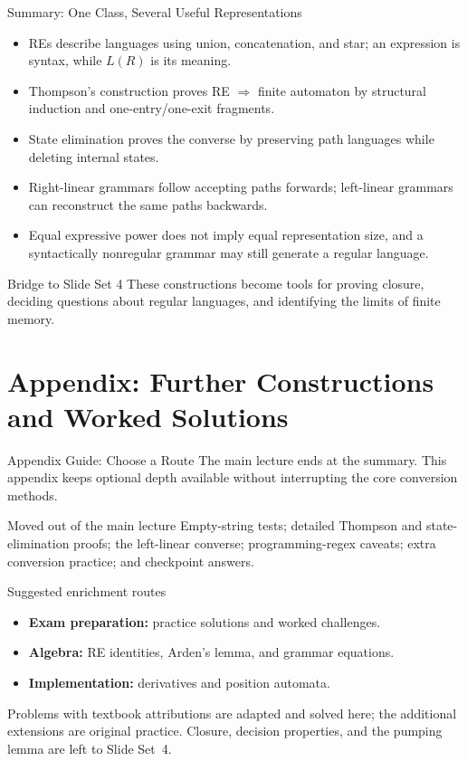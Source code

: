 \documentclass[10pt]{beamer}
\begin{document}
\begin{frame}{Summary: One Class, Several Useful Representations}
  \small
  \begin{itemize}
    \item REs describe languages using union, concatenation, and star;
      an expression is syntax, while $L(R)$ is its meaning.
    \pause
    \item Thompson's construction proves RE $\Rightarrow$ finite automaton
      by structural induction and one-entry/one-exit fragments.
    \pause
    \item State elimination proves the converse by preserving path languages
      while deleting internal states.
    \pause
    \item Right-linear grammars follow accepting paths forwards; left-linear
      grammars can reconstruct the same paths backwards.
    \pause
    \item Equal expressive power does not imply equal representation size,
      and a syntactically nonregular grammar may still generate a regular
      language.
  \end{itemize}
  \begin{block}{Bridge to Slide Set 4}
    These constructions become tools for proving closure, deciding questions
    about regular languages, and identifying the limits of finite memory.
  \end{block}
\end{frame}

\appendix
\section{Appendix: Further Constructions and Worked Solutions}

\begin{frame}{Appendix Guide: Choose a Route}
  \small
  The main lecture ends at the summary. This appendix keeps optional depth
  available without interrupting the core conversion methods.
  \begin{block}{Moved out of the main lecture}
    Empty-string tests; detailed Thompson and state-elimination proofs;
    the left-linear converse; programming-regex caveats; extra conversion
    practice; and checkpoint answers.
  \end{block}
  \begin{block}{Suggested enrichment routes}
    \begin{itemize}
      \item \textbf{Exam preparation:} practice solutions and worked challenges.
      \item \textbf{Algebra:} RE identities, Arden's lemma, and grammar equations.
      \item \textbf{Implementation:} derivatives and position automata.
    \end{itemize}
  \end{block}
  Problems with textbook attributions are adapted and solved here; the
  additional extensions are original practice. Closure, decision properties,
  and the pumping lemma are left to Slide Set~4.
\end{frame}
\end{document}
